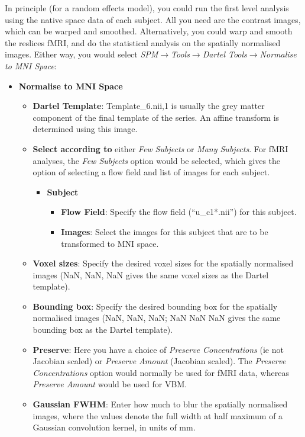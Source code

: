 In principle (for a random effects model), you could run the first level analysis using the native space data of each subject.
All you need are the contrast images, which can be warped and smoothed.
Alternatively, you could warp and smooth the reslices fMRI, and do the statistical analysis on the spatially normalised images.
Either way, you would select \emph{SPM$\rightarrow$Tools$\rightarrow$Dartel Tools$\rightarrow$Normalise to MNI Space}:
\begin{itemize}
\item{{\bf Normalise to MNI Space}
    \begin{itemize}
    \item{{\bf Dartel Template}: Template\_6.nii,1 is usually the grey matter component of the final template of the series.  An affine transform is determined using this image.}
    \item{{\bf Select according to} either \emph{Few Subjects} or \emph{Many Subjects}.  For fMRI analyses, the \emph{Few Subjects} option would be selected, which gives the option of selecting a flow field and list of images for each subject.
      \begin{itemize}
      \item{{\bf Subject}
        \begin{itemize}
        \item{{\bf Flow Field}: Specify the flow field (``u\_c1*.nii'') for this subject.}
        \item{{\bf Images}: Select the images for this subject that are to be transformed to MNI space.}
        \end{itemize}
      }
      \end{itemize}
    }
    \item{{\bf Voxel sizes}: Specify the desired voxel sizes for the spatially normalised images (NaN, NaN, NaN gives the same voxel sizes as the Dartel template).}
    \item{{\bf Bounding box}: Specify the desired bounding box for the spatially normalised images (NaN, NaN, NaN; NaN NaN NaN gives the same bounding box as the Dartel template).}
    \item{{\bf Preserve}: Here you have a choice of \emph{Preserve Concentrations} (ie not Jacobian scaled) or \emph{Preserve Amount} (Jacobian scaled).  The \emph{Preserve Concentrations} option would normally be used for fMRI data, whereas \emph{Preserve Amount} would be used for VBM.}
    \item{{\bf Gaussian FWHM}: Enter how much to blur the spatially normalised images, where the values denote the full width at half maximum of a Gaussian convolution kernel, in units of mm.}
    \end{itemize}
}
\end{itemize}

